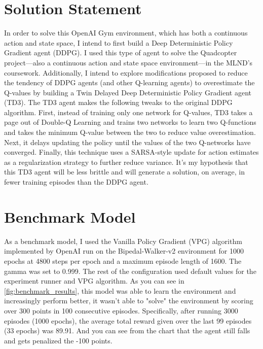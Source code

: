 \documentclass{article}
\begin{document}
\section{Solution Statement}
\label{sec:solution}
In order to solve this OpenAI Gym environment, which has both a continuous action and state space, I intend to first build a Deep Deterministic Policy Gradient agent (DDPG). I used this type of agent to solve the Quadcopter project—also a continuous action and state space environment—in the MLND's coursework. Additionally, I intend to explore modifications proposed to reduce the tendency of DDPG agents (and other Q-learning agents) to overestimate the Q-values by building a Twin Delayed Deep Deterministic Policy Gradient agent (TD3). \cite{DBLP:journals/corr/abs-1802-09477} The TD3 agent makes the following tweaks to the original DDPG algorithm. First, instead of training only one network for Q-values, TD3 takes a page out of Double-Q Learning and trains two networks to learn two Q-functions and takes the minimum Q-value between the two to reduce value overestimation. Next, it delays updating the policy until the values of the two Q-networks have converged. Finally, this technique uses a SARSA-style update for action estimates as a regularization strategy to further reduce variance. It's my hypothesis that this TD3 agent will be less brittle and will generate a solution, on average, in fewer training episodes than the DDPG agent.


\section{Benchmark Model}
\label{sec:benchmark}
As a benchmark model, I used the Vanilla Policy Gradient (VPG) algorithm implemented by OpenAI run on the Bipedal-Walker-v2 environment for 1000 epochs at 4800 steps per epoch and a maximum episode length of 1600. The gamma was set to 0.999. The rest of the configuration used default values for the experiment runner and VPG algorithm. As you can see in \ref{fig:benchmark_results}, this model was able to learn the environment and increasingly perform better, it wasn't able to "solve" the environment by scoring over 300 points in 100 consecutive episodes. Specifically, after running 3000 episodes (1000 epochs), the average total reward given over the last 99 episodes (33 epochs) was 89.91. And you can see from the chart that the agent still falls and gets penalized the -100 points. 
\end{document}
